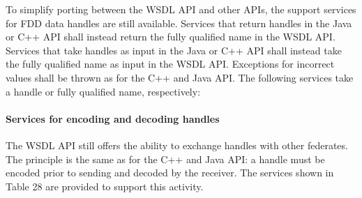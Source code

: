 \begin{compactstdpage}
    \cxiitabletwentysevenb

    To simplify porting between the WSDL API and other APIs, the support services for FDD data handles are still available. Services that return handles in the Java or C++ API shall instead return the fully qualified name in the WSDL API. Services that take handles as input in the Java or C++ API shall instead take the fully qualified name as input in the WSDL API. Exceptions for incorrect values shall be thrown as for the C++ and Java API. The following services take a handle or fully qualified name, respectively:


    \paragraph{Services for encoding and decoding handles}

    The WSDL API still offers the ability to exchange handles with other federates. The principle is the same as for the C++ and Java API: a handle must be encoded prior to sending and decoded by the receiver. The services shown in Table 28 are provided to support this activity.

    \cxiitabletwentyeight

\end{compactstdpage}

\clearpage

